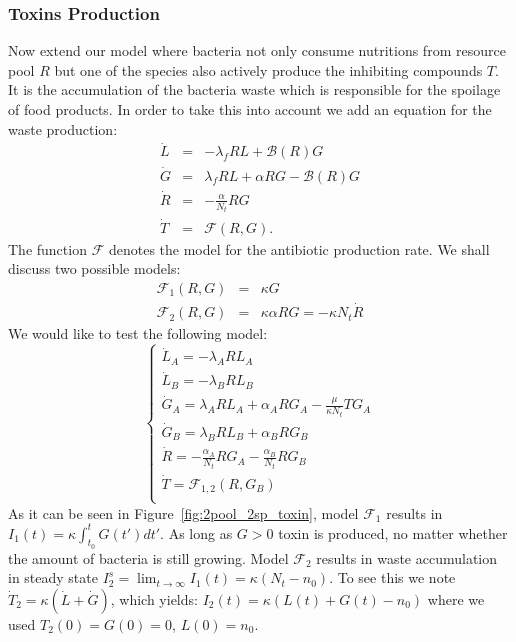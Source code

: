 \documentclass[10pt,A4paper]{article}
\begin{document}
\subsubsection{Toxins Production}
Now extend our model where bacteria not only consume nutritions from resource pool $R$ but one of the species also actively produce the inhibiting compounds $T$. 
It is the accumulation of the bacteria waste which is responsible for the spoilage of food products. 
In order to take this into account we add an equation for the waste production:
\begin{eqnarray}
    \dot{L} &=& - \lambda_f R L + \mathcal{B}(R)G\\
    \dot{G} &=& \lambda_f R L +\alpha R G-\mathcal{B}(R)G\\
    \dot{R} &=&-\frac{\alpha}{N_t} R G\\
    \dot{T} &=& \mathcal{F}(R,G).
\end{eqnarray}
The function $\mathcal{F}$ denotes the model for the antibiotic production rate. 
We shall discuss two possible models:
\begin{eqnarray}
    \mathcal{F}_1(R,G)&=&\kappa G\\
    \mathcal{F}_2(R,G)&=&\kappa\alpha R G=-\kappa N_t\dot{R}
\end{eqnarray}
We would like to test the following model:
\begin{equation}
    \begin{cases}
        \dot{L}_A = - \lambda_A R L_A\\
        \dot{L}_B = - \lambda_B R L_B \\
        \dot{G}_A = \lambda_A R L_A + \alpha_A R G_A - \frac{\mu}{\kappa N_t} T G_A\\
        \dot{G}_B = \lambda_B R L_B + \alpha_B R G_B\\
        \dot{R} = -\frac{\alpha_A}{N_t} R G_A-\frac{\alpha_B}{N_t} R G_B\\
        \dot{T} = \mathcal{F}_{1,2} (R, G_B) \\
    \end{cases}
    \label{eq:model_2sp_toxin}
\end{equation}
%
As it can be seen in Figure~\ref{fig:2pool_2sp_toxin}, model $\mathcal{F}_1$ results in $I_1(t)=\kappa\int_{t_0}^tG(t')dt'$. 
As long as $G>0$ toxin is produced, no matter whether the amount of bacteria is still growing. 
Model $\mathcal{F}_2$ results in waste accumulation in steady state $I_2^s=\lim_{t\to\infty}I_1(t)=\kappa(N_t-n_0)$. 
To see this we note $\dot{T}_2=\kappa(\dot{L}+\dot{G})$, which yields: $I_2(t)=\kappa(L(t)+G(t)-n_0)$ where we used $T_2(0)=G(0)=0$, $L(0)=n_0$. 
\end{document}
